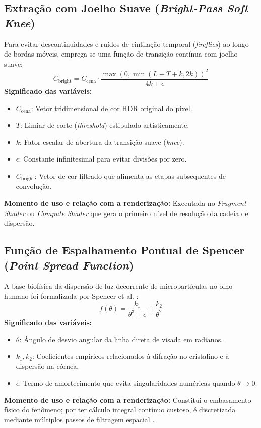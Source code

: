 \documentclass[12pt,a4paper]{article}
\begin{document}
\subsection{Extração com Joelho Suave (\textit{Bright-Pass Soft Knee})}
Para evitar descontinuidades e ruídos de cintilação temporal (\textit{fireflies}) ao longo de bordas móveis, emprega-se uma função de transição contínua com joelho suave:
\begin{equation}
    C_{\text{bright}} = C_{\text{cena}} \cdot \frac{\max\left(0, \min(L - T + k, 2k)\right)^2}{4k + \epsilon}
    \label{eq:softknee}
\end{equation}
\textbf{Significado das variáveis:}
\begin{itemize}
    \item $C_{\text{cena}}$: Vetor tridimensional de cor HDR original do pixel.
    \item $T$: Limiar de corte (\textit{threshold}) estipulado artisticamente.
    \item $k$: Fator escalar de abertura da transição suave (\textit{knee}).
    \item $\epsilon$: Constante infinitesimal para evitar divisões por zero.
    \item $C_{\text{bright}}$: Vetor de cor filtrado que alimenta as etapas subsequentes de convolução.
\end{itemize}
\textbf{Momento de uso e relação com a renderização:} Executada no \textit{Fragment Shader} ou \textit{Compute Shader} que gera o primeiro nível de resolução da cadeia de dispersão.

\subsection{Função de Espalhamento Pontual de Spencer (\textit{Point Spread Function})}
A base biofísica da dispersão de luz decorrente de micropartículas no olho humano foi formalizada por Spencer et al. \cite{spencer1995glare}:
\begin{equation}
    f(\theta) = \frac{k_1}{\theta^3 + \epsilon} + \frac{k_2}{\theta^2}
    \label{eq:psf}
\end{equation}
\textbf{Significado das variáveis:}
\begin{itemize}
    \item $\theta$: Ângulo de desvio angular da linha direta de visada em radianos.
    \item $k_1, k_2$: Coeficientes empíricos relacionados à difração no cristalino e à dispersão na córnea.
    \item $\epsilon$: Termo de amortecimento que evita singularidades numéricas quando $\theta \to 0$.
\end{itemize}
\textbf{Momento de uso e relação com a renderização:} Constitui o embasamento físico do fenômeno; por ter cálculo integral contínuo custoso, é discretizada mediante múltiplos passos de filtragem espacial \cite{cadik2005naturalness}.
\end{document}
